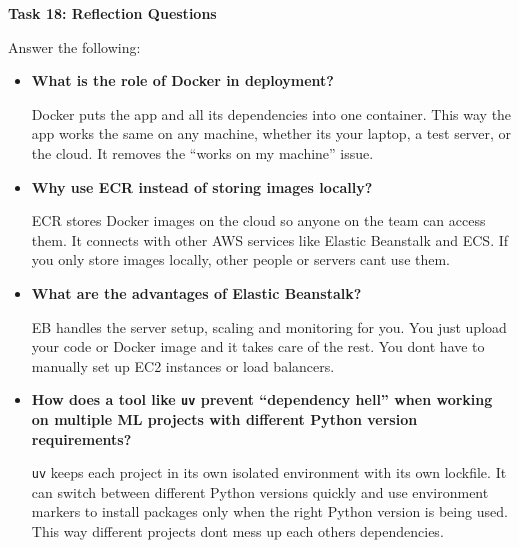 \documentclass[12pt,a4paper]{article}
\begin{document}
\begin{tcolorbox}
\textbf{Task 18: Reflection Questions}

Answer the following:

\begin{itemize}

\item \textbf{What is the role of Docker in deployment?}

Docker puts the app and all its dependencies into one container. This way the app works the same on any machine, whether its your laptop, a test server, or the cloud. It removes the ``works on my machine'' issue.

\vspace{12pt}

\item \textbf{Why use ECR instead of storing images locally?}

ECR stores Docker images on the cloud so anyone on the team can access them. It connects with other AWS services like Elastic Beanstalk and ECS. If you only store images locally, other people or servers cant use them.

\vspace{12pt}

\item \textbf{What are the advantages of Elastic Beanstalk?}

EB handles the server setup, scaling and monitoring for you. You just upload your code or Docker image and it takes care of the rest. You dont have to manually set up EC2 instances or load balancers.

\vspace{12pt}

\item \textbf{How does a tool like \texttt{uv} prevent ``dependency hell'' when working on multiple ML projects with different Python version requirements?}

\texttt{uv} keeps each project in its own isolated environment with its own lockfile. It can switch between different Python versions quickly and use environment markers to install packages only when the right Python version is being used. This way different projects dont mess up each others dependencies.

\end{itemize}

\end{tcolorbox}

\end{document}
